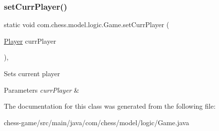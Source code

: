 \subsubsection{\texorpdfstring{setCurrPlayer()}{setCurrPlayer()}}
{\footnotesize\ttfamily static void com.\+chess.\+model.\+logic.\+Game.\+set\+Curr\+Player (\begin{DoxyParamCaption}\item[{\mbox{\hyperlink{classcom_1_1chess_1_1model_1_1logic_1_1_player}{Player}}}]{curr\+Player }\end{DoxyParamCaption})\hspace{0.3cm}{\ttfamily [inline]}, {\ttfamily [static]}}

Sets current player 
\begin{DoxyParams}{Parameters}
{\em curr\+Player} & \\
\hline
\end{DoxyParams}


The documentation for this class was generated from the following file\+:\begin{DoxyCompactItemize}
\item 
chess-\/game/src/main/java/com/chess/model/logic/Game.\+java\end{DoxyCompactItemize}

